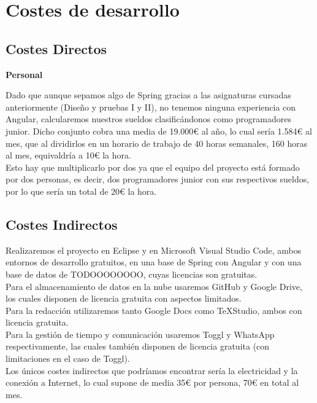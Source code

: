 \section{Costes de desarrollo}
	
\subsection{Costes Directos}	

\textbf{Personal}

Dado que aunque sepamos algo de Spring gracias a las asignaturas cursadas anteriormente (Diseño y pruebas I y II), no tenemos ninguna experiencia con Angular, calcularemos nuestros sueldos clasificándonos como programadores junior. Dicho conjunto cobra una media de 19.000€ al año, lo cual sería 1.584€ al mes, que al dividirlos en un horario de trabajo de 40 horas semanales, 160 horas al mes, equivaldría a 10€ la hora.\\

Esto hay que multiplicarlo por dos ya que el equipo del proyecto está formado por dos personas, es decir, dos programadores junior con sus respectivos sueldos, por lo que sería un total de 20€ la hora.\\

\subsection{Costes Indirectos}

Realizaremos el proyecto en Eclipse y en Microsoft Visual Studio Code, ambos entornos de desarrollo gratuitos, en una base de Spring con Angular y con una base de datos de TODOOOOOOOO, cuyas licencias son gratuitas.\\

Para el almacenamiento de datos en la nube usaremos GitHub y Google Drive, los cuales disponen de licencia gratuita con aspectos limitados.\\

Para la redacción utilizaremos tanto Google Docs como TeXStudio, ambos con licencia gratuita.\\

Para la gestión de tiempo y comunicación usaremos Toggl y WhatsApp respectivamente, las cuales también disponen de licencia gratuita (con limitaciones en el caso de Toggl).\\

Los únicos costes indirectos que podríamos encontrar sería la electricidad y la conexión a Internet, lo cual supone de media 35€ por persona, 70€ en total al mes.\\

